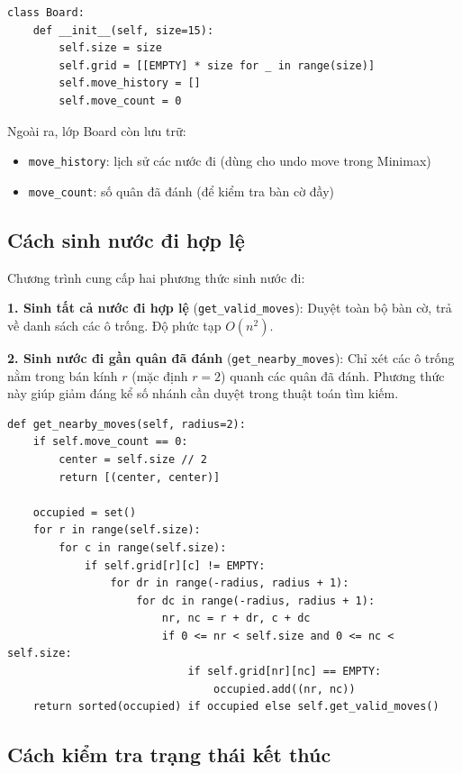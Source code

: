 \documentclass[12pt,a4paper]{article}
\begin{document}
\begin{lstlisting}[style=python]
class Board:
    def __init__(self, size=15):
        self.size = size
        self.grid = [[EMPTY] * size for _ in range(size)]
        self.move_history = []
        self.move_count = 0
\end{lstlisting}

Ngoài ra, lớp Board còn lưu trữ:
\begin{itemize}
    \item \texttt{move\_history}: lịch sử các nước đi (dùng cho undo move trong Minimax)
    \item \texttt{move\_count}: số quân đã đánh (để kiểm tra bàn cờ đầy)
\end{itemize}

\subsection{Cách sinh nước đi hợp lệ}

Chương trình cung cấp hai phương thức sinh nước đi:

\textbf{1. Sinh tất cả nước đi hợp lệ} (\texttt{get\_valid\_moves}): Duyệt toàn bộ bàn cờ, trả về danh sách các ô trống. Độ phức tạp $O(n^2)$.

\textbf{2. Sinh nước đi gần quân đã đánh} (\texttt{get\_nearby\_moves}): Chỉ xét các ô trống nằm trong bán kính $r$ (mặc định $r=2$) quanh các quân đã đánh. Phương thức này giúp giảm đáng kể số nhánh cần duyệt trong thuật toán tìm kiếm.

\begin{lstlisting}[style=python]
def get_nearby_moves(self, radius=2):
    if self.move_count == 0:
        center = self.size // 2
        return [(center, center)]
    
    occupied = set()
    for r in range(self.size):
        for c in range(self.size):
            if self.grid[r][c] != EMPTY:
                for dr in range(-radius, radius + 1):
                    for dc in range(-radius, radius + 1):
                        nr, nc = r + dr, c + dc
                        if 0 <= nr < self.size and 0 <= nc < self.size:
                            if self.grid[nr][nc] == EMPTY:
                                occupied.add((nr, nc))
    return sorted(occupied) if occupied else self.get_valid_moves()
\end{lstlisting}

\subsection{Cách kiểm tra trạng thái kết thúc}
\end{document}
